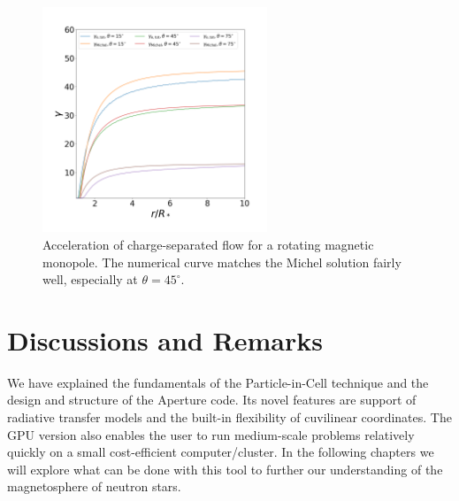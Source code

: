 \begin{figure}[h]
  \centering
  \includegraphics[width=0.6\textwidth]{pics/chap1/monopole-accel.png}
  \caption[Acceleration of charge-separated flow for a rotating magnetic
  monopole.]{Acceleration of charge-separated flow for a rotating magnetic
    monopole. The numerical curve matches the Michel solution fairly well,
    especially at $\theta = 45^{\circ}$.}
  \label{fig:monopole-accel}
\end{figure}



\section{Discussions and Remarks}
\label{sec:code-discussions}

We have explained the fundamentals of the Particle-in-Cell technique and the
design and structure of the Aperture code. Its novel features are support of
radiative transfer models and the built-in flexibility of cuvilinear
coordinates. The GPU version also enables the user to run medium-scale problems
relatively quickly on a small cost-efficient computer/cluster. In the following
chapters we will explore what can be done with this tool to further our
understanding of the magnetosphere of neutron stars.

